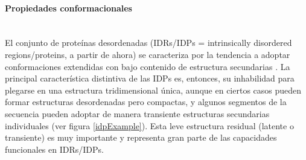 



% 







\paragraph{Propiedades conformacionales} \hspace{0pt} \\
\indent El conjunto de proteínas desordenadas (IDRs/IDPs = intrinsically disordered regions/proteins, a partir de ahora) se caracteriza por 
la tendencia a adoptar conformaciones extendidas con bajo contenido de estructura secundarias \cite{habchi2014introducing}.
La principal característica distintiva de las IDPs es, entonces, su inhabilidad para plegarse en una estructura tridimensional única, aunque en ciertos casos
pueden formar estructuras desordenadas pero compactas, y algunos segmentos de la secuencia pueden adoptar de manera transiente estructuras secundarias individuales (ver figura \ref{idpExample}).
Esta leve estructura residual (latente o transiente) es muy importante y representa gran parte de las capacidades funcionales en IDRs/IDPs.

